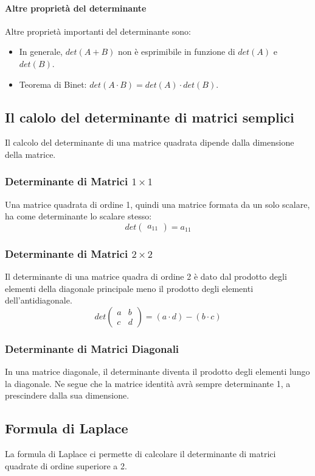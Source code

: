 \paragraph{Altre proprietà del determinante}
Altre proprietà importanti del determinante sono:
\begin{itemize}
	\item In generale, $det(A+B)$ non è esprimibile in funzione di $det(A)$ e $det(B)$.
	\item Teorema di Binet: $det(A\cdot B) = det(A)\cdot det(B)$.
\end{itemize}

\subsection{Il calolo del determinante di matrici semplici}
Il calcolo del determinante di una matrice quadrata dipende dalla dimensione della matrice.
\subsubsection{Determinante di Matrici $1\times 1$}
Una matrice quadrata di ordine 1, quindi una matrice formata da un solo scalare, ha come determinante lo scalare stesso:
\[
	det
	\begin{pmatrix}
		a_{11}
	\end{pmatrix}
	= a_{11}
\]
\subsubsection{Determinante di Matrici $2\times2$}
Il determinante di una matrice quadra di ordine 2 è dato dal prodotto degli elementi della diagonale principale meno il prodotto degli elementi dell'antidiagonale.
\[
	det
	\begin{pmatrix}
		a & b \\
		c & d
	\end{pmatrix}
	= (a \cdot d) - (b\cdot c)
\]

\subsubsection{Determinante di Matrici Diagonali}
In una matrice diagonale, il determinante diventa il prodotto degli elementi lungo la diagonale.
Ne segue che la matrice identità avrà sempre determinante 1, a prescindere dalla sua dimensione.
\subsection{Formula di Laplace}
La formula di Laplace ci permette di calcolare il determinante di matrici quadrate di ordine superiore a 2.

